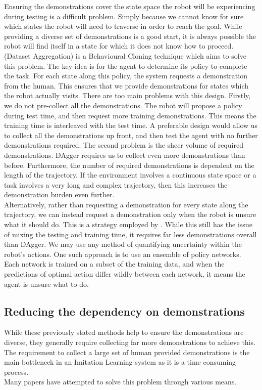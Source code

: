 Ensuring the demonstrations cover the state space the robot will be experiencing during testing is a difficult problem. Simply because we cannot know for sure which states the robot will need to traverse in order to reach the goal. While providing a diverse set of demonstrations is a good start, it is always possible the robot will find itself in a state for which it does not know how to proceed.  (Dataset Aggregation) is a Behavioural Cloning technique which aims to solve this problem. The key idea is for the agent to determine its policy to complete the task. For each state along this policy, the system requests a demonstration from the human. This ensures that we provide demonstrations for states which the robot actually visits. There are too main problems with this design. Firstly, we do not pre-collect all the demonstrations. The robot will propose a policy during test time, and then request more training demonstrations. This means the training time is interleaved with the test time. A preferable design would allow us to collect all the demonstrations up front, and then test the agent with no further demonstrations required. The second problem is the sheer volume of required demonstrations. DAgger requires us to collect even more demonstrations than before. Furthermore, the number of required demonstrations is dependent on the length of the trajectory. If the environment involves a continuous state space or a task involves a very long and complex trajectory, then this increases the demonstration burden even further.\\

Alternatively, rather than requesting a demonstration for every state along the trajectory, we can instead request a demonstration only when the robot is unsure what it should do. This is a strategy employed by . While this still has the issue of mixing the testing and training time, it requires far less demonstrations overall than DAgger. We may use any method of quantifying uncertainty within the robot's actions. One such approach is to use an ensemble of policy networks. Each network is trained on a subset of the training data, and when the predictions of optimal action differ wildly between each network, it means the agent is unsure what to do.

\subsection{Reducing the dependency on demonstrations}
\label{subsec:one-shot}
While these previously stated methods help to ensure the demonstrations are diverse, they generally require collecting far more demonstrations to achieve this. The requirement to collect a large set of human provided demonstrations is the main bottleneck in an Imitation Learning system as it is a time consuming process.\\
Many papers have attempted to solve this problem through various means.\\

